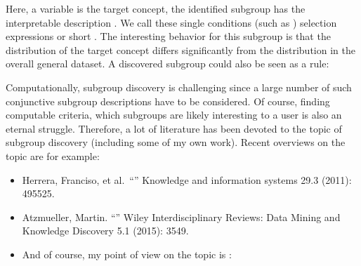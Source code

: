 \documentclass[letterpaper,10pt,english]{sphinxmanual}
\begin{document}
Here, a variable  is the target concept, the identified subgroup has the interpretable description . We call these single conditions (such as ) selection expressions or short . The interesting behavior for this subgroup is that the distribution of the target concept differs significantly from the distribution in the overall general dataset. A discovered subgroup could also be seen as a rule:

\begin{sphinxVerbatim}[commandchars=\\\{\}]
        
\end{sphinxVerbatim}

Computationally, subgroup discovery is challenging since a large number of such conjunctive subgroup descriptions have to be considered. Of course, finding computable criteria, which subgroups are likely interesting to a user is also an eternal struggle. Therefore, a lot of literature has been devoted to the topic of subgroup discovery (including some of my own work). Recent overviews on the topic are for example:
\begin{itemize}
\item {} 
Herrera, Franciso, et al. “” Knowledge and information systems 29.3 (2011): 495\sphinxhyphen{}525.

\item {} 
Atzmueller, Martin. “” Wiley Interdisciplinary Reviews: Data Mining and Knowledge Discovery 5.1 (2015): 35\sphinxhyphen{}49.

\item {} 
And of course, my point of view on the topic is :

\end{itemize}
\end{document}
